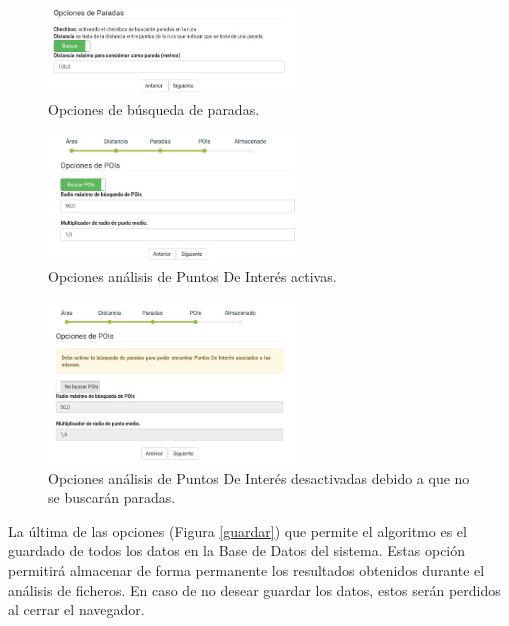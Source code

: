 \begin{figure}[h]
  \centering
    \includegraphics[width=0.6\textwidth]{../img/manualusuario/paradasi.jpg}
  \caption{Opciones de búsqueda de paradas.}
  \label{paradasi}
\end{figure}


\begin{figure}[h]
  \centering
    \includegraphics[width=0.6\textwidth]{../img/manualusuario/poisi.jpg}
  \caption{Opciones análisis de Puntos De Interés activas.}
  \label{poisi}
\end{figure}


\begin{figure}[h]
  \centering
    \includegraphics[width=0.6\textwidth]{../img/manualusuario/poino.jpg}
  \caption{Opciones análisis de Puntos De Interés desactivadas debido a que no se buscarán paradas.}
  \label{poino}
\end{figure}

La última de las opciones (Figura \ref{guardar}) que permite el algoritmo es el guardado de todos los datos en la Base de Datos del sistema. Estas opción permitirá almacenar de forma permanente los resultados obtenidos durante el análisis de ficheros. En caso de no desear guardar los datos, estos serán perdidos al cerrar el navegador.

